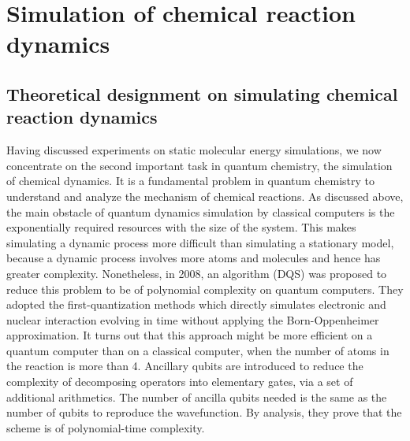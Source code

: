 \documentclass[8.5pt,twoside,twocolumn]{article}
\begin{document}
\section{Simulation of chemical reaction dynamics}

\subsection{Theoretical designment on simulating chemical reaction dynamics}

Having discussed experiments on
static molecular energy simulations,
we now concentrate on the second important task in quantum chemistry,
the simulation of chemical dynamics.
It is a fundamental problem in quantum chemistry
to understand and analyze the mechanism of chemical reactions.
As discussed above, the main obstacle of quantum dynamics simulation
by classical computers is the exponentially required resources
with the size of the system.\cite{Open_Dynamics} This makes simulating a dynamic process
more difficult than simulating a stationary model,
because a dynamic process involves more atoms and molecules
and hence has greater complexity.
Nonetheless, in 2008, an algorithm (DQS) was proposed to reduce this problem
to be of polynomial complexity on quantum computers.\cite{Polynomial_time_algorithm}
They adopted the first-quantization methods
which directly simulates electronic and nuclear interaction
evolving in time without applying
the Born-Oppenheimer approximation.
It turns out that this approach might be more efficient
on a quantum computer than on a classical computer,
when the number of atoms in the reaction is more than 4.
Ancillary qubits are introduced
to reduce the complexity of decomposing operators
into elementary gates,
via a set of additional arithmetics.
The number of ancilla qubits needed is the same as
the number of qubits to reproduce the wavefunction.
By analysis, they prove that the scheme is
of polynomial-time complexity.
\end{document}
